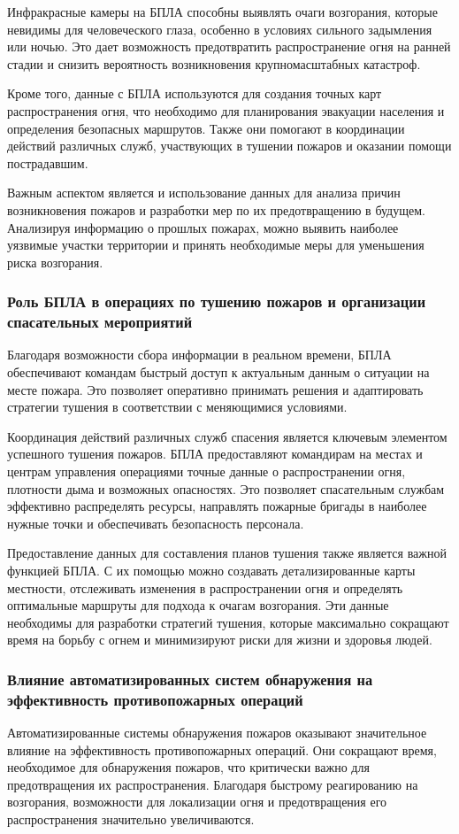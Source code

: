 Инфракрасные камеры на БПЛА способны выявлять очаги возгорания, которые невидимы для человеческого глаза, особенно в условиях сильного задымления или ночью. Это дает возможность предотвратить распространение огня на ранней стадии и снизить вероятность возникновения крупномасштабных катастроф.

Кроме того, данные с БПЛА используются для создания точных карт распространения огня, что необходимо для планирования эвакуации населения и определения безопасных маршрутов. Также они помогают в координации действий различных служб, участвующих в тушении пожаров и оказании помощи пострадавшим.

Важным аспектом является и использование данных для анализа причин возникновения пожаров и разработки мер по их предотвращению в будущем. Анализируя информацию о прошлых пожарах, можно выявить наиболее уязвимые участки территории и принять необходимые меры для уменьшения риска возгорания.
\subsubsection{Роль БПЛА в операциях по тушению пожаров и \hspace{5mm} организации спасательных мероприятий}
Благодаря возможности сбора информации в реальном времени, БПЛА обеспечивают командам быстрый доступ к актуальным данным о ситуации на месте пожара. Это позволяет оперативно принимать решения и адаптировать стратегии тушения в соответствии с меняющимися условиями.

Координация действий различных служб спасения является ключевым элементом успешного тушения пожаров. БПЛА предоставляют командирам на местах и центрам управления операциями точные данные о распространении огня, плотности дыма и возможных опасностях. Это позволяет спасательным службам эффективно распределять ресурсы, направлять пожарные бригады в наиболее нужные точки и обеспечивать безопасность персонала.

Предоставление данных для составления планов тушения также является важной функцией БПЛА. С их помощью можно создавать детализированные карты местности, отслеживать изменения в распространении огня и определять оптимальные маршруты для подхода к очагам возгорания. Эти данные необходимы для разработки стратегий тушения, которые максимально сокращают время на борьбу с огнем и минимизируют риски для жизни и здоровья людей.
\subsubsection{Влияние автоматизированных систем обнаружения на эффективность противопожарных операций}
Автоматизированные системы обнаружения пожаров оказывают значительное влияние на эффективность противопожарных операций. Они сокращают время, необходимое для обнаружения пожаров, что критически важно для предотвращения их распространения. Благодаря быстрому реагированию на возгорания, возможности для локализации огня и предотвращения его распространения значительно увеличиваются.

